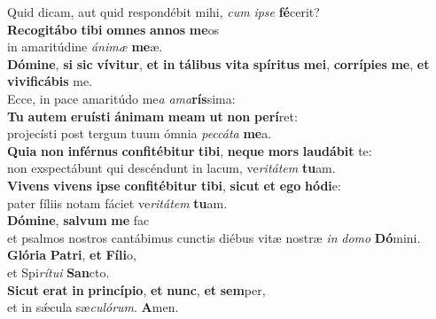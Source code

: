 \oddverse Quid dicam, aut quid respondébit mihi, \textit{cum} \textit{i}\textit{pse} \textbf{fé}cerit?\\
\evenverse \textbf{Re}\textbf{co}\textbf{gi}\textbf{tá}\textbf{bo} \textbf{ti}\textbf{bi} \textbf{om}\textbf{nes} \textbf{an}\textbf{nos} \textbf{me}os~\*\\
\evenverse in amaritúdine \textit{á}\textit{ni}\textit{mæ} \textbf{me}æ.\\
\oddverse \textbf{Dó}\textbf{mi}\textbf{ne}, \textbf{si} \textbf{sic} \textbf{ví}\textbf{vi}\textbf{tur}, \textbf{et} \textbf{in} \textbf{tá}\textbf{li}\textbf{bus} \textbf{vi}\textbf{ta} \textbf{spí}\textbf{ri}\textbf{tus} \textbf{me}\textbf{i}, \textbf{cor}\textbf{rí}\textbf{pi}\textbf{es} \textbf{me}, \textbf{et} \textbf{vi}\textbf{vi}\textbf{fi}\textbf{cá}\textbf{bis} me.~\*\\
\oddverse Ecce, in pace amaritúdo me\textit{a} \textit{a}\textit{ma}\textbf{rís}sima:\\
\evenverse \textbf{Tu} \textbf{au}\textbf{tem} \textbf{e}\textbf{ru}\textbf{í}\textbf{sti} \textbf{á}\textbf{ni}\textbf{mam} \textbf{me}\textbf{am} \textbf{ut} \textbf{non} \textbf{pe}\textbf{rí}ret:~\*\\
\evenverse projecísti post tergum tuum ómnia \textit{pec}\textit{cá}\textit{ta} \textbf{me}a.\\
\oddverse \textbf{Qui}\textbf{a} \textbf{non} \textbf{in}\textbf{fér}\textbf{nus} \textbf{con}\textbf{fi}\textbf{té}\textbf{bi}\textbf{tur} \textbf{ti}\textbf{bi}, \textbf{ne}\textbf{que} \textbf{mors} \textbf{lau}\textbf{dá}\textbf{bit} te:~\*\\
\oddverse non exspectábunt qui descéndunt in lacum, ve\textit{ri}\textit{tá}\textit{tem} \textbf{tu}am.\\
\evenverse \textbf{Vi}\textbf{vens} \textbf{vi}\textbf{vens} \textbf{i}\textbf{pse} \textbf{con}\textbf{fi}\textbf{té}\textbf{bi}\textbf{tur} \textbf{ti}\textbf{bi}, \textbf{si}\textbf{cut} \textbf{et} \textbf{e}\textbf{go} \textbf{hó}\textbf{di}e:~\*\\
\evenverse pater fíliis notam fáciet ve\textit{ri}\textit{tá}\textit{tem} \textbf{tu}am.\\
\oddverse \textbf{Dó}\textbf{mi}\textbf{ne}, \textbf{sal}\textbf{vum} \textbf{me} fac~\*\\
\oddverse et psalmos nostros cantábimus cunctis diébus vitæ nostræ \textit{in} \textit{do}\textit{mo} \textbf{Dó}mini.\\
\evenverse \textbf{Gló}\textbf{ri}\textbf{a} \textbf{Pa}\textbf{tri}, \textbf{et} \textbf{Fí}\textbf{li}o,~\*\\
\evenverse et Spi\textit{rí}\textit{tu}\textit{i} \textbf{San}cto.\\
\oddverse \textbf{Si}\textbf{cut} \textbf{e}\textbf{rat} \textbf{in} \textbf{prin}\textbf{cí}\textbf{pi}\textbf{o}, \textbf{et} \textbf{nunc}, \textbf{et} \textbf{sem}per,~\*\\
\oddverse et in sǽcula sæ\textit{cu}\textit{ló}\textit{rum}. \textbf{A}men.\\
